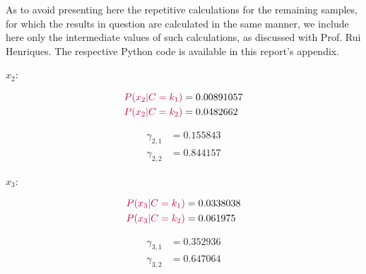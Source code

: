 \documentclass[12pt]{article}
\begin{document}
\begin{enumerate}[leftmargin=\labelsep]
\begin{itemize}[leftmargin=]
                \pagebreak

                As to avoid presenting here the repetitive calculations for the remaining samples,
                for which the results in question are calculated in the same manner, we include here
                only the intermediate values of such calculations, as discussed with Prof. Rui
                Henriques. The respective Python code is available in this report's appendix.

                \begin{paracol}{2}
                  \setlength{\columnseprule}{1pt}
                  \def\columnseprulecolor{\color{black}}
                  \centering

                  $x_2$:

                  \begin{equation*}
                    \begin{aligned}
                      \textcolor{purple}{P(x_2 | C = k_1)} & = 0.00891057 \\
                      \textcolor{purple}{P(x_2 | C = k_2)} & = 0.0482662
                    \end{aligned}
                  \end{equation*}

                  \begin{equation*}
                    \begin{aligned}
                      \gamma_{2, 1} & = 0.155843 \\
                      \gamma_{2, 2} & = 0.844157
                    \end{aligned}
                  \end{equation*}

                  \switchcolumn

                  $x_3$:

                  \begin{equation*}
                    \begin{aligned}
                      \textcolor{purple}{P(x_3 | C = k_1)} & = 0.0338038 \\
                      \textcolor{purple}{P(x_3 | C = k_2)} & = 0.061975
                    \end{aligned}
                  \end{equation*}

                  \begin{equation*}
                    \begin{aligned}
                      \gamma_{3, 1} & = 0.352936 \\
                      \gamma_{3, 2} & = 0.647064
                    \end{aligned}
                  \end{equation*}


\end{paracol}
\end{itemize}
\end{enumerate}
\end{document}
